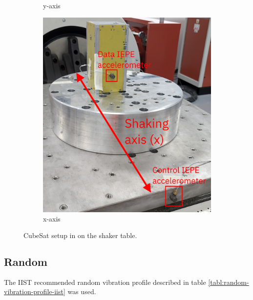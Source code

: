 \documentclass{report}
\begin{document}
\begin{figure}[H]
\begin{subfigure}{0.32\textwidth}
    \caption{y-axis}
  \end{subfigure}
  \begin{subfigure}{0.32\textwidth}
    \includegraphics[width=\linewidth]{images/x-axis-setup.jpg}
    \caption{x-axis}
  \end{subfigure}
  \caption{CubeSat setup in on the shaker table.}
  \label{fig:shaker-axis-setup}
\end{figure}

\subsection{Random}

The IIST recommended random vibration profile described in table \ref{tabl:random-vibration-profile-iist} was used.


\end{document}
